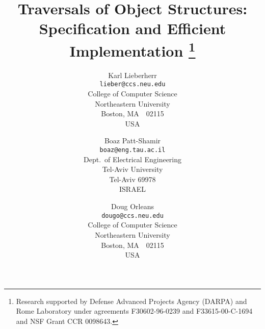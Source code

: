 \setlength{\textheight}{8.9in}
\setlength{\textwidth}{6.7in}
\setlength{\evensidemargin}{-0.2in}
\setlength{\oddsidemargin}{-0.2in}
\setlength{\headheight}{0in}
\setlength{\headsep}{10pt}
\setlength{\topsep}{0in}
\setlength{\topmargin}{0.0in}
\setlength{\itemsep}{0in}       %
\renewcommand{\baselinestretch}{1.1}
\parskip=0.070in


\title{
Traversals of Object Structures: Specification and  Efficient
Implementation%
\thanks{
Research supported by  Defense
Advanced Projects Agency (DARPA) and Rome Laboratory under agreements
F30602-96-0239 and F33615-00-C-1694 and NSF Grant CCR 0098643.
}
}

\author{
Karl Lieberherr \\
{\tt lieber@ccs.neu.edu}\\
{College of Computer Science}\\
{Northeastern University}\\
{Boston, MA~~02115}\\
USA
\and
Boaz Patt-Shamir\\
{\tt boaz@eng.tau.ac.il}\\
Dept.\ of Electrical Engineering\\
Tel-Aviv University\\
Tel-Aviv 69978\\
ISRAEL
\and
Doug Orleans\\
{\tt dougo@ccs.neu.edu}\\
{College of Computer Science}\\
{Northeastern University}\\
{Boston, MA~~02115}\\
USA
}




\def\thepage{}

\maketitle



